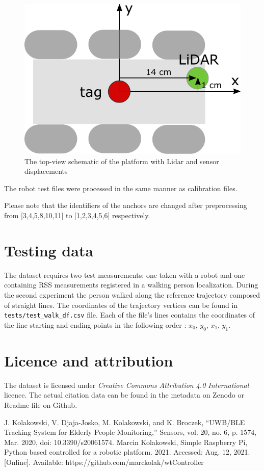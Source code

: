 \documentclass[conference, 11pt, onecolumn]{IEEEtran}
\begin{document}
\begin{figure}[h]
\centering
\includegraphics[width=.5\columnwidth]{figs/displacement}
\caption{\label{fig:displacement}The top-view schematic of the platform with Lidar and sensor displacements}
\end{figure}

The robot test files were processed in the same manner as calibration files.


\color{red}
Please note that the identifiers of the anchors are changed after preprocessing from [3,4,5,8,10,11] to [1,2,3,4,5,6] respectively.
\color{black}


\section{Testing data}
The dataset requires two test measurements: one taken with a robot and one containing RSS measurements registered in a walking person localization. During the second experiment the person walked along the reference trajectory composed of straight lines. The coordinates of the trajectory vertices can be found in \texttt{tests/test\_walk\_df.csv} file. Each of the file's lines contains the coordinates of the line starting and ending points in the following order : $x_0$, $y_0$, $x_1$, $y_1$.





\section{Licence and attribution}

The dataset is licensed under \textit{Creative Commons Attribution 4.0 International} licence. The actual citation data can be found in the metadata on Zenodo or Readme file on Github.




\begin{thebibliography}{00} 
 J. Kolakowski, V. Djaja-Josko, M. Kolakowski, and K. Broczek, “UWB/BLE Tracking System for Elderly People Monitoring,” Sensors, vol. 20, no. 6, p. 1574, Mar. 2020, doi: 10.3390/s20061574.
 Marcin Kolakowski, Simple Raspberry Pi, Python based controlled for a robotic platform. 2021. Accessed: Aug. 12, 2021. [Online]. Available: https://github.com/marckolak/wtController


\end{thebibliography}
\vspace{12pt}
\color{red}
\end{document}
